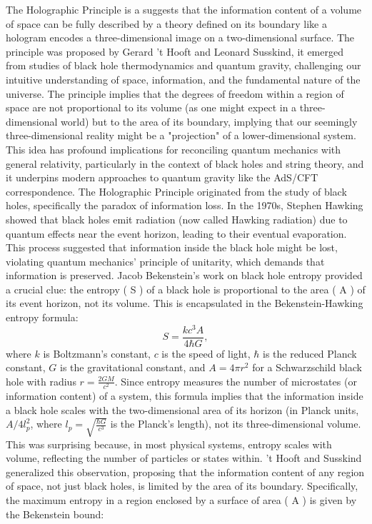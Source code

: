 The Holographic Principle is a suggests that the information content of a volume of space can be fully described by a theory defined on its boundary like a hologram encodes a three-dimensional image on a two-dimensional surface. The principle was proposed by Gerard ’t Hooft and Leonard Susskind, it emerged from studies of black hole thermodynamics and quantum gravity, challenging our intuitive understanding of space, information, and the fundamental nature of the universe. The principle implies that the degrees of freedom within a region of space are not proportional to its volume (as one might expect in a three-dimensional world) but to the area of its boundary, implying that our seemingly three-dimensional reality might be a "projection" of a lower-dimensional system. This idea has profound implications for reconciling quantum mechanics with general relativity, particularly in the context of black holes and string theory, and it underpins modern approaches to quantum gravity like the AdS/CFT correspondence.
The Holographic Principle originated from the study of black holes, specifically the paradox of information loss. In the 1970s, Stephen Hawking showed that black holes emit radiation (now called Hawking radiation) due to quantum effects near the event horizon, leading to their eventual evaporation. This process suggested that information inside the black hole might be lost, violating quantum mechanics’ principle of unitarity, which demands that information is preserved. Jacob Bekenstein’s work on black hole entropy provided a crucial clue: the entropy ( S ) of a black hole is proportional to the area ( A ) of its event horizon, not its volume. This is encapsulated in the Bekenstein-Hawking entropy formula:
$$ S = \frac{k c^3 A}{4 \hbar G}, $$
where \( k \) is Boltzmann’s constant, \( c \) is the speed of light, \( \hbar \) is the reduced Planck constant, \( G \) is the gravitational constant, and \( A = 4\pi r^2 \) for a Schwarzschild black hole with radius \( r = \frac{2GM}{c^2} \). Since entropy measures the number of microstates (or information content) of a system, this formula implies that the information inside a black hole scales with the two-dimensional area of its horizon (in Planck units, \( A/4l_p^2 \), where \( l_p = \sqrt{\frac{\hbar G}{c^3}} \) is the Planck's length), not its three-dimensional volume. This was surprising because, in most physical systems, entropy scales with volume, reflecting the number of particles or states within.
’t Hooft and Susskind generalized this observation, proposing that the information content of any region of space, not just black holes, is limited by the area of its boundary. Specifically, the maximum entropy in a region enclosed by a surface of area ( A ) is given by the Bekenstein bound:
